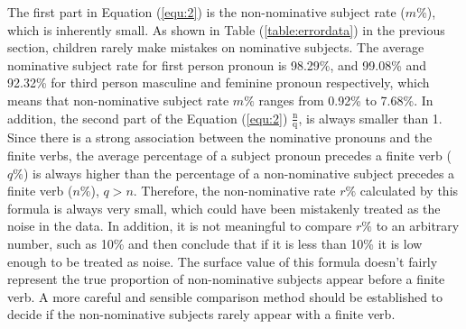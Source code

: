 The first part in Equation (\ref{equ:2}) is the non-nominative subject rate ($m\%$), which is inherently small. As shown in Table (\ref{table:errordata}) in the previous section, children rarely make mistakes on nominative subjects. The average nominative subject rate for first person pronoun is 98.29\%, and 99.08\% and 92.32\% for third person masculine and feminine pronoun respectively, which means that non-nominative subject rate $m\%$ ranges from 0.92\% to 7.68\%. In addition, the second part of the Equation (\ref{equ:2}) $\displaystyle\frac{\text{n}}{\text{q}}$, is always smaller than 1. Since there is a strong association between the nominative pronouns and the finite verbs, the average percentage of a subject pronoun precedes a finite verb ($q\%$) is always higher than the percentage of a non-nominative subject precedes a finite verb ($n\%$),  $q > n$. Therefore, the non-nominative rate $r\%$ calculated by this formula is always very small, which could have been mistakenly treated as the noise in the data. In addition, it is not meaningful to compare $r\%$ to an arbitrary number, such as 10\% and then conclude that if it is less than 10\% it is low enough to be treated as noise. The surface value of this formula doesn't fairly represent the true proportion of non-nominative subjects appear before a finite verb. A more careful and sensible comparison method should be established to decide if the non-nominative subjects rarely appear with a finite verb. 

